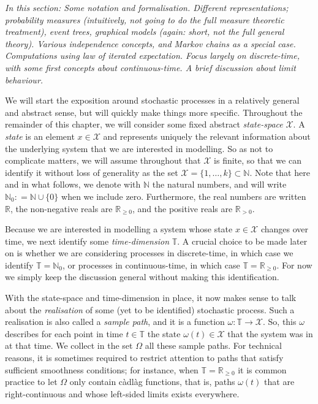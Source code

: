 \documentclass[11pt]{book}
\newcommand{\nats}{\mathbb{N}}
\newcommand{\natswith}{\nats_{0}}
\newcommand{\reals}{\mathbb{R}}
\newcommand{\realspos}{\reals_{>0}}
\newcommand{\realsnonneg}{\reals_{\geq 0}}
\newcommand{\states}{\mathcal{X}}
\newcommand{\coloneqq}{:\!=}
\newcommand{\timedim}{\mathbb{T}}
\begin{document}
\emph{In this section: Some notation and formalisation. Different representations; probability measures (intuitively, not going to do the full measure theoretic treatment), event trees, graphical models (again: short, not the full general theory). Various independence concepts, and Markov chains as a special case. Computations using law of iterated expectation. Focus largely on discrete-time, with some first concepts about continuous-time. A brief discussion about limit behaviour.}

We will start the exposition around stochastic processes in a relatively general and abstract sense, but will quickly make things more specific. Throughout the remainder of this chapter, we will consider some fixed abstract \emph{state-space} $\states$. A \emph{state} is an element $x\in\states$ and represents uniquely the relevant information about the underlying system that we are interested in modelling. So as not to complicate matters, we will assume throughout that $\states$ is finite, so that we can identify it without loss of generality as the set $\states=\{1,\ldots,k\}\subset\nats$. Note that here and in what follows, we denote with $\nats$ the natural numbers, and will write $\natswith\coloneqq\nats\cup\{0\}$ when we include zero. Furthermore, the real numbers are written $\reals$, the non-negative reals are $\realsnonneg$, and the positive reals are $\realspos$.

Because we are interested in modelling a system whose state $x\in\states$ changes over time, we next identify some \emph{time-dimension} $\timedim$. A crucial choice to be made later on is whether we are considering processes in discrete-time, in which case we identify $\timedim=\natswith$, or processes in continuous-time, in which case $\timedim=\realsnonneg$. For now we simply keep the discussion general without making this identification.

With the state-space and time-dimension in place, it now makes sense to talk about the \emph{realisation} of some (yet to be identified) stochastic process. Such a realisation is also called a \emph{sample path}, and it is a function $\omega:\timedim\to\states$. So, this $\omega$ describes for each point in time $t\in\timedim$ the state $\omega(t)\in\states$ that the system was in at that time. We collect in the set $\Omega$ all these sample paths. For technical reasons, it is sometimes required to restrict attention to paths that satisfy sufficient smoothness conditions; for instance, when $\timedim=\realsnonneg$ it is common practice to let $\Omega$ only contain c\`adl\`ag functions, that is, paths $\omega(t)$ that are right-continuous and whose left-sided limits exists everywhere.
\end{document}

